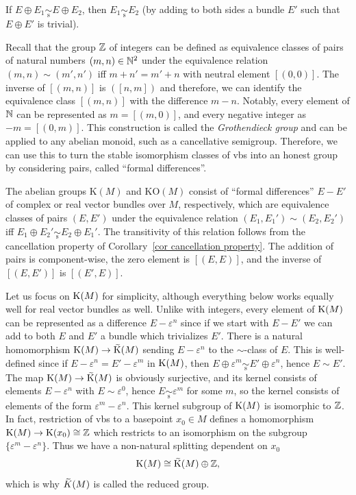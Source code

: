\begin{cor}\label{cor cancellation property}
    If $E\oplus E_1\underset{\mathrm{s}}{\sim} E\oplus E_2$, then $E_1\underset{\mathrm{s}}{\sim}E_2$ (by adding to both sides a bundle $E'$ such that $E\oplus E'$ is trivial).
\end{cor}

Recall that the group $\mathbb{Z}$ of integers can be defined as equivalence classes of pairs of natural numbers $(m,n)\in \mathbb{N}^2$ under the equivalence relation $(m,n)\sim (m',n')$ iff $m+n'=m'+n$ with neutral element $[(0,0)]$. The inverse of $[(m,n)]$ is $([n,m])$ and therefore, we can identify the equivalence class $[(m,n)]$ with the difference $m-n$. Notably, every element of $\mathbb{N}$ can be represented as $m=[(m,0)]$, and every negative integer as $-m=[(0,m)]$. This construction is called the \emph{Grothendieck group} and can be applied to any abelian monoid, such as a cancellative semigroup. Therefore, we can use this to turn the stable isomorphism classes of \glspl{vb} into an honest group by considering pairs, called ``formal differences''.

\begin{defn}[K-groups]
    The abelian groups $\mathrm{K}(M)$ and $\mathrm{KO}(M)$ consist of ``formal differences'' $E-E'$ of complex or real vector bundles over $M$, respectively, which are equivalence classes of pairs $(E,E')$ under the equivalence relation $(E_1,E_1')\sim (E_2,E_2')$ iff $E_1\oplus E_2'\underset{\mathrm{s}}{\sim} E_2\oplus E_1'$. The transitivity of this relation follows from the cancellation property of Corollary~\ref{cor cancellation property}. The addition of pairs is component-wise, the zero element is $[(E,E)]$, and the inverse of $[(E,E')]$ is $[(E',E)]$.
\end{defn}

Let us focus on $\mathrm{K}(M)$ for simplicity, although everything below works equally well for real vector bundles as well. Unlike with integers, every element of $\mathrm{K}(M)$ can be represented as a difference $E-\varepsilon^n$ since if we start with $E-E'$ we can add to both $E$ and $E'$ a bundle which trivializes $E'$. There is a natural homomorphism $\rmK(M)\to \wt{\rmK}(M)$ sending $E-\varepsilon^n$ to the $\sim$-class of $E$. This is well-defined since if $E-\varepsilon^n=E'-\varepsilon^m$ in $\mathrm{K}(M)$, then $E\oplus \varepsilon^m\underset{\mathrm{s}}{\sim} E'\oplus \varepsilon^n$, hence $E\sim E'$. The map $\rmK(M)\to\wt{\rmK}(M)$ is obviously surjective, and its kernel consists of elements $E-\varepsilon^n$ with $E\sim \varepsilon^0$, hence $E\underset{\mathrm{s}}{\sim}\varepsilon^m$ for some $m$, so the kernel consists of elements of the form $\varepsilon^m-\varepsilon^n$. This kernel subgroup of $\mathrm{K}(M)$ is isomorphic to $\mathbb{Z}$. In fact, restriction of \glspl{vb} to a basepoint $x_0\in M$ defines a homomorphism $\mathrm{K}(M)\to \mathrm{K}(x_0)\cong \mathbb{Z}$ which restricts to an isomorphism on the subgroup $\{\varepsilon^m-\varepsilon^n\}$. Thus we have a non-natural splitting dependent on $x_0$
\[\rmK(M)\cong \wt{\rmK}(M)\oplus \bbZ,\]
which is why $\wt{K}(M)$ is called the reduced group.


